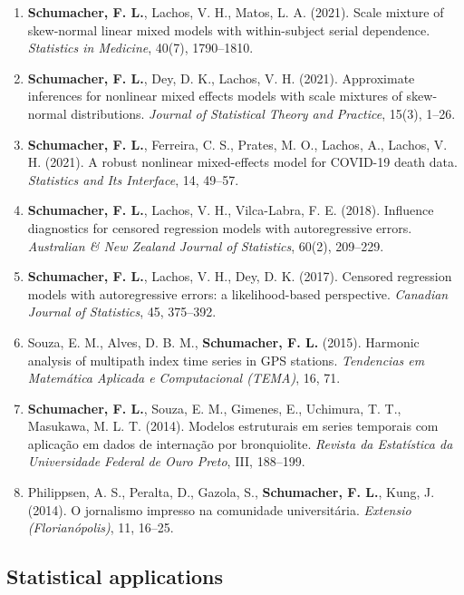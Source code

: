 \documentclass[
  10pt,
  letterpaper,
]{article}
\begin{document}
\begin{enumerate}
  C., Castro, L. M. C. (2024). A censored time series analysis for
  responses on the unit interval: an application to acid rain modeling.
  \emph{Sankhya A}, 86, 637--660.
\item
  \textbf{Schumacher, F. L.}, Lachos, V. H., Matos, L. A. (2021). Scale
  mixture of skew-normal linear mixed models with within-subject serial
  dependence. \emph{Statistics in Medicine}, 40(7), 1790--1810.
\item
  \textbf{Schumacher, F. L.}, Dey, D. K., Lachos, V. H. (2021).
  Approximate inferences for nonlinear mixed effects models with scale
  mixtures of skew-normal distributions. \emph{Journal of Statistical
  Theory and Practice}, 15(3), 1--26.
\item
  \textbf{Schumacher, F. L.}, Ferreira, C. S., Prates, M. O., Lachos,
  A., Lachos, V. H. (2021). A robust nonlinear mixed-effects model for
  COVID-19 death data. \emph{Statistics and Its Interface}, 14, 49--57.
\item
  \textbf{Schumacher, F. L.}, Lachos, V. H., Vilca-Labra, F. E. (2018).
  Influence diagnostics for censored regression models with
  autoregressive errors. \emph{Australian \& New Zealand Journal of
  Statistics}, 60(2), 209--229.
\item
  \textbf{Schumacher, F. L.}, Lachos, V. H., Dey, D. K. (2017). Censored
  regression models with autoregressive errors: a likelihood-based
  perspective. \emph{Canadian Journal of Statistics}, 45, 375--392.
\item
  Souza, E. M., Alves, D. B. M., \textbf{Schumacher, F. L.} (2015).
  Harmonic analysis of multipath index time series in GPS stations.
  \emph{Tendencias em Matemática Aplicada e Computacional (TEMA)}, 16,
  71.
\item
  \textbf{Schumacher, F. L.}, Souza, E. M., Gimenes, E., Uchimura, T.
  T., Masukawa, M. L. T. (2014). Modelos estruturais em series temporais
  com aplicação em dados de internação por bronquiolite. \emph{Revista
  da Estatística da Universidade Federal de Ouro Preto}, III, 188--199.
\item
  Philippsen, A. S., Peralta, D., Gazola, S., \textbf{Schumacher, F.
  L.}, Kung, J. (2014). O jornalismo impresso na comunidade
  universitária. \emph{Extensio (Florianópolis)}, 11, 16--25.
\end{enumerate}

\subsection{Statistical applications}\label{statistical-applications}
\end{document}
